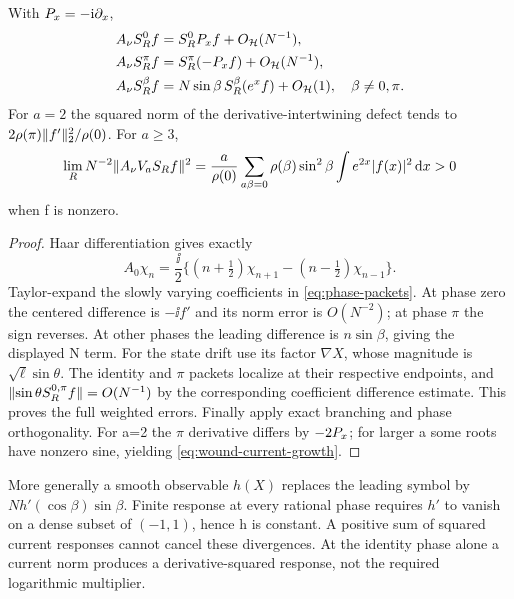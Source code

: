 \begin{proposition}\label{prop:phase-current}
With $P_x=-\mathrm i\partial_x$,
\begin{align}
A_\nu S_R^0 f&=S_R^0P_x f+O_{\mathcal H}(N^{-1}),\\
A_\nu S_R^\pi f&=S_R^\pi(-P_x f)+O_{\mathcal H}(N^{-1}),\\
A_\nu S_R^\beta f&=N\sin\beta\,S_R^\beta(e^x f)+O_{\mathcal H}(1),
\quad\beta\ne0,\pi .
\end{align}
For $a=2$ the squared norm of the derivative-intertwining defect
tends to $2\rho(\pi)\lVert f'\rVert_2^2/\rho(0)$. For $a\ge3$,
\begin{equation}\label{eq:wound-current-growth}
\lim_R N^{-2}\lVert A_\nu V_aS_Rf\rVert^2
=\frac{a}{\rho(0)}
\sum_{a\beta=0}\rho(\beta)\sin^2\beta
       \int e^{2x}|f(x)|^2\,\mathrm d x>0
\end{equation}
when f is nonzero.
\end{proposition}
\begin{proof}
Haar differentiation gives exactly
\begin{equation}
A_0\chi_n=\frac{\ii}{2}
\{(n+\tfrac12)\chi_{n+1}-(n-\tfrac12)\chi_{n-1}\}.
\end{equation}
Taylor-expand the slowly varying coefficients in
\eqref{eq:phase-packets}. At phase zero the centered difference
is $-\ii f'$ and its norm error is $O(N^{-2})$; at phase $\pi$
the sign reverses. At other phases the leading difference is
$n\sin\beta$, giving the displayed N term.
For the state drift use its factor $\nabla X$, whose magnitude
is $\sqrt\ell\sin\theta$. The identity and $\pi$ packets localize
at their respective endpoints, and
$\lVert \sin\theta S_R^{0,\pi}f\rVert=O(N^{-1})$ by the corresponding
coefficient difference estimate. This proves the full weighted
errors. Finally apply exact branching and phase orthogonality.
For a=2 the $\pi$ derivative differs by $-2P_x$; for larger a
some roots have nonzero sine, yielding \eqref{eq:wound-current-growth}.
\end{proof}
More generally a smooth observable $h(X)$ replaces the leading
symbol by $Nh'(\cos\beta)\sin\beta$. Finite response at every
rational phase requires $h'$ to vanish on a dense subset of
$(-1,1)$, hence h is constant. A positive sum of squared current
responses cannot cancel these divergences. At the identity phase
alone a current norm produces a derivative-squared response,
not the required logarithmic multiplier.

